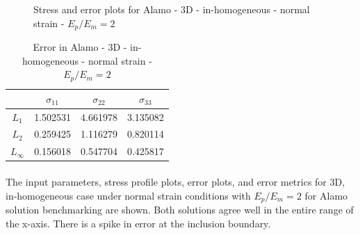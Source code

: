 \documentclass[12pt, a4paper]{report}
\begin{document}
\begin{figure}[htbp]
  \centering
  \hfill
  \caption{Stress and error plots for Alamo - 3D - in-homogeneous - normal strain - $E_p/E_m = 2$}
\end{figure}

\begin{table}[H]
    \centering
    \begin{tabular}{|c|c|c|c|}
        \hline
        &\textbf{$\sigma_{11}$} &  \textbf{$\sigma_{22}$} & \textbf{$\sigma_{33}$}\\
        \hline
        $L_1$ & 1.502531 & 4.661978 & 3.135082 \\
        \hline
        $L_2$ & 0.259425 & 1.116279 & 0.820114 \\
        \hline 
        $L_\infty$ & 0.156018 & 0.547704 & 0.425817 \\
        \hline
    \end{tabular}
    \caption{Error in Alamo - 3D - in-homogeneous - normal strain - $E_p/E_m = 2$}
\end{table}

\paragraph{}
The input parameters, stress profile plots, error plots, and error metrics for 3D, in-homogeneous case under normal strain conditions with $E_p/E_m = 2$ for Alamo solution benchmarking are shown. Both solutions agree well in the entire range of the x-axis. There is a spike in error at the inclusion boundary.
\end{document}
